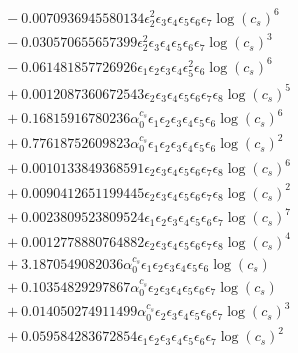 \documentclass[10pt]{article}
\begin{document}
\begin{align*}
&{}  - 0.0070936945580134 \epsilon_{2}^{2} \epsilon_{3} \epsilon_{4} \epsilon_{5} \epsilon_{6} \epsilon_{7} \log{\left(c_{s} \right)}^{6} \\
&{}  - 0.030570655657399 \epsilon_{2}^{2} \epsilon_{3} \epsilon_{4} \epsilon_{5} \epsilon_{6} \epsilon_{7} \log{\left(c_{s} \right)}^{3} \\
&{}  - 0.061481857726926 \epsilon_{1} \epsilon_{2} \epsilon_{3} \epsilon_{4} \epsilon_{5}^{2} \epsilon_{6} \log{\left(c_{s} \right)}^{6} \\
&{}  + 0.0012087360672543 \epsilon_{2} \epsilon_{3} \epsilon_{4} \epsilon_{5} \epsilon_{6} \epsilon_{7} \epsilon_{8} \log{\left(c_{s} \right)}^{5} \\
&{}  + 0.16815916780236 \alpha_{0}^{c_s} \epsilon_{1} \epsilon_{2} \epsilon_{3} \epsilon_{4} \epsilon_{5} \epsilon_{6} \log{\left(c_{s} \right)}^{6} \\
&{}  + 0.77618752609823 \alpha_{0}^{c_s} \epsilon_{1} \epsilon_{2} \epsilon_{3} \epsilon_{4} \epsilon_{5} \epsilon_{6} \log{\left(c_{s} \right)}^{2} \\
&{}  + 0.0010133849368591 \epsilon_{2} \epsilon_{3} \epsilon_{4} \epsilon_{5} \epsilon_{6} \epsilon_{7} \epsilon_{8} \log{\left(c_{s} \right)}^{6} \\
&{}  + 0.0090412651199445 \epsilon_{2} \epsilon_{3} \epsilon_{4} \epsilon_{5} \epsilon_{6} \epsilon_{7} \epsilon_{8} \log{\left(c_{s} \right)}^{2} \\
&{}  + 0.0023809523809524 \epsilon_{1} \epsilon_{2} \epsilon_{3} \epsilon_{4} \epsilon_{5} \epsilon_{6} \epsilon_{7} \log{\left(c_{s} \right)}^{7} \\
&{}  + 0.0012778880764882 \epsilon_{2} \epsilon_{3} \epsilon_{4} \epsilon_{5} \epsilon_{6} \epsilon_{7} \epsilon_{8} \log{\left(c_{s} \right)}^{4} \\
&{}  + 3.1870549082036 \alpha_{0}^{c_s} \epsilon_{1} \epsilon_{2} \epsilon_{3} \epsilon_{4} \epsilon_{5} \epsilon_{6} \log{\left(c_{s} \right)} \\
&{}  + 0.10354829297867 \alpha_{0}^{c_s} \epsilon_{2} \epsilon_{3} \epsilon_{4} \epsilon_{5} \epsilon_{6} \epsilon_{7} \log{\left(c_{s} \right)} \\
&{}  + 0.014050274911499 \alpha_{0}^{c_s} \epsilon_{2} \epsilon_{3} \epsilon_{4} \epsilon_{5} \epsilon_{6} \epsilon_{7} \log{\left(c_{s} \right)}^{3} \\
&{}  + 0.059584283672854 \epsilon_{1} \epsilon_{2} \epsilon_{3} \epsilon_{4} \epsilon_{5} \epsilon_{6} \epsilon_{7} \log{\left(c_{s} \right)}^{2} \\

\end{align*}
\end{document}
